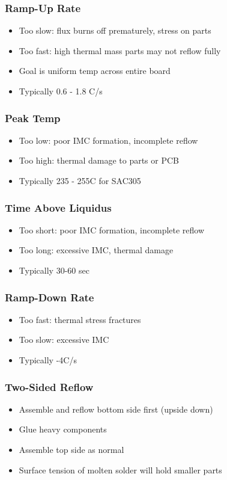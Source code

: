 \documentclass{beamer}
\begin{document}
\begin{frame}
\frametitle{Ramp-Up Rate}
\begin{itemize}
\item Too slow: flux burns off prematurely, stress on parts
\item Too fast: high thermal mass parts may not reflow fully
\item Goal is uniform temp across entire board
\item Typically 0.6 - 1.8 C/s
\end{itemize}
\end{frame}

\begin{frame}
\frametitle{Peak Temp}
\begin{itemize}
\item Too low: poor IMC formation, incomplete reflow
\item Too high: thermal damage to parts or PCB
\item Typically 235 - 255C for SAC305
\end{itemize}
\end{frame}

\begin{frame}
\frametitle{Time Above Liquidus}
\begin{itemize}
\item Too short: poor IMC formation, incomplete reflow
\item Too long: excessive IMC, thermal damage
\item Typically 30-60 sec
\end{itemize}
\end{frame}

\begin{frame}
\frametitle{Ramp-Down Rate}
\begin{itemize}
\item Too fast: thermal stress fractures
\item Too slow: excessive IMC
\item Typically -4C/s
\end{itemize}
\end{frame}

\begin{frame}
\frametitle{Two-Sided Reflow}
\begin{itemize}
\item Assemble and reflow bottom side first (upside down)
\item Glue heavy components
\item Assemble top side as normal
\item Surface tension of molten solder will hold smaller parts
\end{itemize}
\end{frame}
\end{document}
